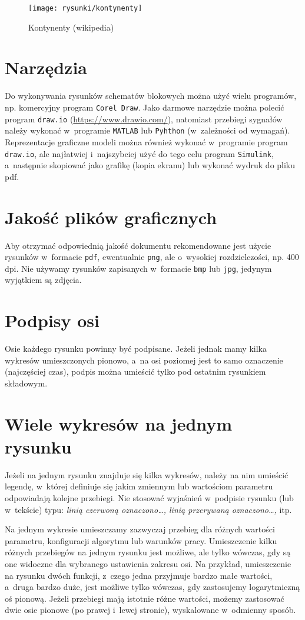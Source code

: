 \begin{figure}[H]
\centering
\texttt{[image: rysunki/kontynenty]}
\caption{Kontynenty (wikipedia)}
\label{rys_kontynenty}
\end{figure}

\section{Narzędzia}
Do wykonywania rysunków schematów blokowych można użyć wielu programów, np. komercyjny program \texttt{Corel Draw}. Jako darmowe narzędzie można polecić program \verb+draw.io+ (\url{https://www.drawio.com/}), natomiast przebiegi sygnałów należy wykonać w~programie \texttt{MATLAB} lub \texttt{Pyhthon} (w~zależności od wymagań). Reprezentacje graficzne modeli można również wykonać w~programie program \verb+draw.io+, ale najłatwiej i~najszybciej użyć do tego celu program \texttt{Simulink}, a~następnie skopiować jako grafikę (kopia ekranu) lub wykonać wydruk do pliku pdf.

\section{Jakość plików graficznych}
Aby otrzymać odpowiednią jakość dokumentu rekomendowane jest użycie rysunków w~formacie \verb+pdf+, ewentualnie \verb+png+, ale o~wysokiej rozdzielczości, np. 400 dpi. Nie używamy rysunków zapisanych w~formacie \verb+bmp+ lub \verb+jpg+, jedynym wyjątkiem są zdjęcia.

\section{Podpisy osi}
Osie każdego rysunku powinny być podpisane. Jeżeli jednak mamy kilka wykresów umieszczonych pionowo, a~na osi poziomej jest to samo oznaczenie (najczęściej czas), podpis można umieścić tylko pod ostatnim rysunkiem składowym.

\section{Wiele wykresów na jednym rysunku}
Jeżeli na jednym rysunku znajduje się kilka wykresów, należy na nim umieścić legendę, w~której definiuje się jakim zmiennym lub wartościom parametru odpowiadają kolejne przebiegi. Nie stosować wyjaśnień w~podpisie rysunku (lub w~tekście) typu: \emph{linią czerwoną oznaczono\ldots, linią przerywaną oznaczono\ldots,} itp.

Na jednym wykresie umieszczamy zazwyczaj przebieg dla różnych wartości parametru, konfiguracji algorytmu lub warunków pracy. Umieszczenie kilku różnych przebiegów na jednym rysunku jest możliwe, ale tylko wówczas, gdy są one widoczne dla wybranego ustawienia zakresu osi. Na przykład, umieszczenie na rysunku dwóch funkcji, z~czego jedna przyjmuje bardzo małe wartości, a~druga bardzo duże, jest możliwe tylko wówczas, gdy zastosujemy logarytmiczną oś pionową. Jeżeli przebiegi mają istotnie różne wartości, możemy zastosować dwie osie pionowe (po prawej i~lewej stronie), wyskalowane w~odmienny sposób.

